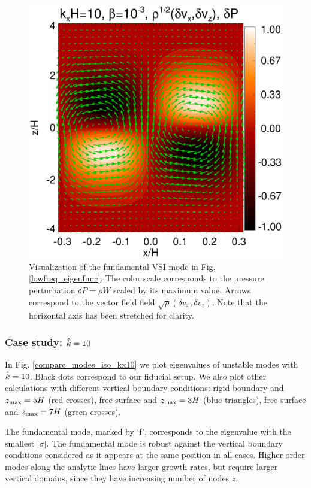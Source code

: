 \begin{figure}
  \includegraphics[width=\linewidth]{figures/result2d_iso}
  \caption{Visualization of the fundamental VSI mode in
    Fig. \ref{lowfreq_eigenfunc}. The color scale corresponds to the
    pressure perturbation $\delta P=\rho W$ scaled by its maximum value.
    Arrows correspond to the vector field field $\sqrt{\rho}(\delta
    v_x,\delta v_z)$. Note that the horizontal axis has been stretched 
    for clarity.  
    \label{lowfreq_eigenfunc_2d}
  }
\end{figure}


\subsubsection{Case study: $\hat{k}=10$}
In Fig. \ref{compare_modes_iso_kx10} we plot eigenvalues of unstable 
modes with $\hat{k}=10$. Black dots correspond to our fiducial setup. 
We also plot other calculations with different
vertical boundary conditions: rigid boundary and $z_\mathrm{max}=5H$ (red
crosses),  free surface and $z_\mathrm{max} = 3H$ (blue triangles), free surface
and $z_\mathrm{max}=7H$ (green crosses). 

The fundamental mode, marked by `f', corresponds to the eigenvalue
with the smallest $|\sigma|$. The fundamental mode is
robust against the vertical boundary conditions considered as it
appears at the same position in all cases. Higher order modes along
the analytic lines have larger growth rates, but require larger
vertical domains, since they have increasing number of nodes  $z$.  

